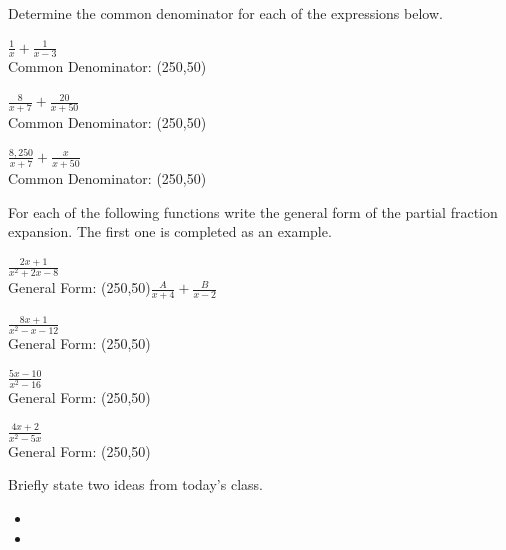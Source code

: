 \begin{problem}
\item Determine the common denominator for each of the expressions below.
  \begin{subproblem}
    \item $\frac{1}{x} + \frac{1}{x-3}$ \\
      Common Denominator: \framebox(250,50){~}
      \vfill
    \item $\frac{8}{x+7} + \frac{20}{x+50}$ \\
      Common Denominator: \framebox(250,50){~}
      \vfill
    \item $\frac{8,250}{x+7} + \frac{x}{x+50}$ \\
      Common Denominator: \framebox(250,50){~}
      \vfill
  \end{subproblem}

  \clearpage

\item For each of the following functions write the general form of
  the partial fraction expansion. The first one is completed as an
  example.
  \begin{subproblem}
    \item $\frac{2x+1}{x^2+2x-8}$ \\
      General Form: \framebox(250,50){$\frac{A}{x+4} + \frac{B}{x-2}$}
      \vfill
    \item $\frac{8x+1}{x^2-x-12}$ \\
      General Form: \framebox(250,50){~}
      \vfill
    \item $\frac{5x-10}{x^2-16}$ \\
      General Form: \framebox(250,50){~}
      \vfill
    \item $\frac{4x+2}{x^2-5x}$ \\
      General Form: \framebox(250,50){~}
      \vfill
  \end{subproblem}

\end{problem}

\postClass

\begin{problem}
\item Briefly state two ideas from today's class.
  \begin{itemize}
  \item 
  \item 
  \end{itemize}
\item 
  \begin{subproblem}
    \item
  \end{subproblem}
\end{problem}


